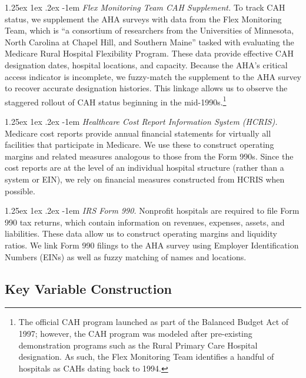 \documentclass[a4paper, 12pt, twoside]{article}
\makeatletter
\renewcommand\paragraph{\@startsection{paragraph}{4}{\z@}%
   {1.25ex \@plus 1ex \@minus .2ex}%
   {-1em}%
   {\normalfont\itshape}}
\makeatother
\begin{document}
\paragraph{\textit{Flex Monitoring Team CAH Supplement.}}  
To track CAH status, we supplement the AHA surveys with data from the Flex Monitoring Team, which is ``a consortium of researchers from the Universities of Minnesota, North Carolina at Chapel Hill, and Southern Maine'' tasked with evaluating the Medicare Rural Hospital Flexibility Program. These data provide effective CAH designation dates, hospital locations, and capacity. Because the AHA’s critical access indicator is incomplete, we fuzzy-match the supplement to the AHA survey to recover accurate designation histories. This linkage allows us to observe the staggered rollout of CAH status beginning in the mid-1990s.\footnote{The official CAH program launched as part of the Balanced Budget Act of 1997; however, the CAH program was modeled after pre-existing demonstration programs such as the Rural Primary Care Hospital designation. As such, the Flex Monitoring Team identifies a handful of hospitals as CAHs dating back to 1994.}

\paragraph{\textit{Healthcare Cost Report Information System (HCRIS).}}  
Medicare cost reports provide annual financial statements for virtually all facilities that participate in Medicare. We use these to construct operating margins and related measures analogous to those from the Form 990s. Since the cost reports are at the level of an individual hospital structure (rather than a system or EIN), we rely on financial measures constructed from HCRIS when possible.

\paragraph{\textit{IRS Form 990.}}  
Nonprofit hospitals are required to file Form 990 tax returns, which contain information on revenues, expenses, assets, and liabilities. These data allow us to construct operating margins and liquidity ratios. We link Form 990 filings to the AHA survey using Employer Identification Numbers (EINs) as well as fuzzy matching of names and locations.  


\subsection{Key Variable Construction}
\end{document}
